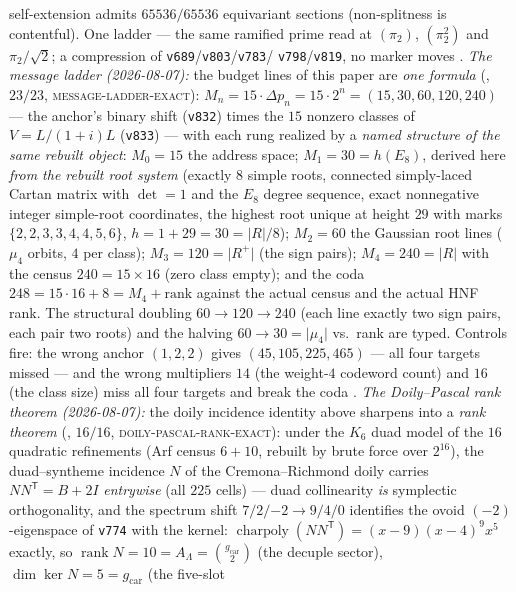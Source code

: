 \documentclass[11pt,a4paper]{article}
\newcommand{\gcar}{g_{\mathrm{car}}}
\theoremstyle{definition}
\begin{document}
\begin{keybox}
self-extension admits $65536/65536$ equivariant sections
(non-splitness is contentful).  One ladder --- the same ramified
prime read at $(\pi_2)$, $(\pi_2^2)$ and $\pi_2/\sqrt2$; a
compression of \texttt{v689}/\texttt{v803}/\texttt{v783}/%
\texttt{v798}/\texttt{v819}, no marker moves \mE.
\emph{The message ladder (2026-08-07):} the budget lines of this
paper are \emph{one formula}
(, $23/23$,
\textsc{message-ladder-exact}): $M_n = 15\cdot\Delta p_n =
15\cdot2^n = (15, 30, 60, 120, 240)$ --- the anchor's binary
shift (\texttt{v832}) times the $15$ nonzero classes of
$V = L/(1{+}i)L$ (\texttt{v833}) --- with each rung realized by a
\emph{named structure of the same rebuilt object}: $M_0 = 15$ the
address space; $M_1 = 30 = h(E_8)$, derived here \emph{from the
rebuilt root system} (exactly $8$ simple roots, connected
simply-laced Cartan matrix with $\det = 1$ and the $E_8$ degree
sequence, exact nonnegative integer simple-root coordinates, the
highest root unique at height $29$ with marks
$\{2,2,3,3,4,4,5,6\}$, $h = 1 + 29 = 30 = \lvert R\rvert/8$);
$M_2 = 60$ the Gaussian root lines ($\mu_4$ orbits, $4$ per
class); $M_3 = 120 = \lvert R^+\rvert$ (the sign pairs);
$M_4 = 240 = \lvert R\rvert$ with the census $240 = 15\times16$
(zero class empty); and the coda $248 = 15\cdot16 + 8 = M_4 +
\mathrm{rank}$ against the actual census and the actual HNF rank.
The structural doubling $60 \to 120 \to 240$ (each line exactly
two sign pairs, each pair two roots) and the halving $60 \to 30 =
\lvert\mu_4\rvert$ vs.\ rank are typed.  Controls fire: the wrong
anchor $(1,2,2)$ gives $(45, 105, 225, 465)$ --- all four targets
missed --- and the wrong multipliers $14$ (the weight-$4$
codeword count) and $16$ (the class size) miss all four targets
and break the coda \mE.
\emph{The Doily--Pascal rank theorem (2026-08-07):} the doily
incidence identity above sharpens into a \emph{rank theorem}
(, $16/16$,
\textsc{doily-pascal-rank-exact}): under the $K_6$ duad model of
the $16$ quadratic refinements (Arf census $6 + 10$, rebuilt by
brute force over $2^{16}$), the duad--syntheme incidence $N$ of
the Cremona--Richmond doily carries $NN^{\mathsf T} = B + 2I$
\emph{entrywise} (all $225$ cells) --- duad collinearity
\emph{is} symplectic orthogonality, and the spectrum shift
$7/2/{-2} \to 9/4/0$ identifies the ovoid $(-2)$-eigenspace of
\texttt{v774} with the kernel: $\operatorname{charpoly}
(NN^{\mathsf T}) = (x-9)(x-4)^9x^5$ exactly, so
$\operatorname{rank} N = 10 = A_\Lambda = \binom{\gcar}{2}$ (the
decuple sector), $\dim\ker N = 5 = \gcar$ (the five-slot

\end{keybox}
\end{document}
